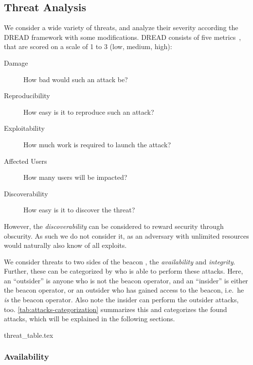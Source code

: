 \subsection{Threat Analysis}
We consider a wide variety of threats, and analyze their severity according the DREAD framework with some modifications. DREAD consists of five metrics~\cite{dread}, that are scored on a scale of 1 to 3 (low, medium, high):
\begin{description}
    \item [Damage] How bad would such an attack be?
    \item [Reproducibility] How easy is it to reproduce such an attack?
    \item [Exploitability] How much work is required to launch the attack?
    \item [Affected Users] How many users will be impacted?
    \item [Discoverability] How easy is it to discover the threat?
\end{description}

However, the \emph{discoverability} can be considered to reward security through obscurity. As such we do not consider it, as an adversary with unlimited resources would naturally also know of all exploits.

We consider threats to two sides of the beacon , the \emph{availability} and \emph{integrity}. Further, these can be categorized by who is able to perform these attacks. Here, an \enquote{outsider} is anyone who is not the beacon operator, and an \enquote{insider} is either the beacon operator, or an outsider who has gained access to the beacon, i.e.\ he \emph{is} the beacon operator. Also note the insider can perform the outsider attacks, too. \cref{tab:attacks-categorization} summarizes this and categorizes the found attacks, which will be explained in the following sections.

{threat_table.tex}

\subsubsection{Availability}

\newcommand{\parathreat}[1]{\paragraph{#1}\hspace{-1ex}}


